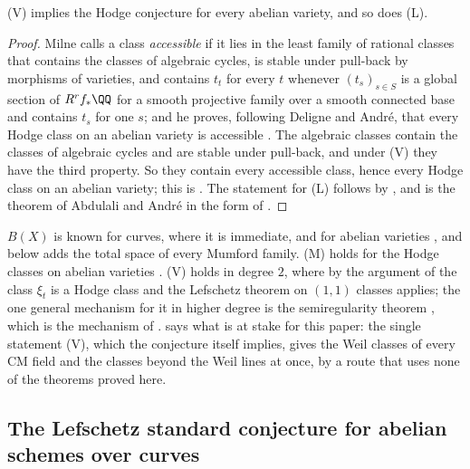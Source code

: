 \begin{theorem}\label{thm:vhcab}
\textup{(V)} implies the Hodge conjecture for every abelian variety, and so
does \textup{(L)}.
\end{theorem}

\begin{proof}
Milne calls a class \emph{accessible} if it lies in the least family of
rational classes that contains the classes of algebraic cycles, is stable
under pull-back by morphisms of varieties, and contains $t_{t}$ for every $t$
whenever $(t_{s})_{s\in S}$ is a global section of $R^{r}f_{*}\QQ$ for a
smooth projective family over a smooth connected base and contains $t_{s}$
for one $s$; and he proves, following Deligne and Andr\'e, that every Hodge
class on an abelian variety is accessible \cite[\S5.1, Theorem~3]{Mil20}.
The algebraic classes contain the classes of algebraic cycles and are stable
under pull-back, and under \textup{(V)} they have the third property. So they
contain every accessible class, hence every Hodge class on an abelian
variety; this is \cite[Remark~2]{Mil20}. The statement for \textup{(L)}
follows by , and is the theorem of Abdulali and Andr\'e in
the form of \cite[Theorem~4]{Mil20}.
\end{proof}

\begin{remark}\label{rem:lmvknown}
$B(X)$ is known for curves, where it is immediate,
and for abelian varieties \cite[\S2]{Kle68}, and 
below adds the total space of every Mumford family. \textup{(M)} holds for the Hodge
classes on abelian varieties \cite[Th\'eor\`eme~0.6.2]{And96b}.
\textup{(V)} holds in degree $2$, where by the argument of
 the class $\xi_{t}$ is a Hodge class and the Lefschetz
theorem on $(1,1)$ classes applies; the one general mechanism for it in
higher degree is the semiregularity theorem \cite{Blo72,BF03,Pri24}, which is the
mechanism of \cite[Theorem~2.3]{paperII}.  says what is at
stake for this paper: the single statement \textup{(V)}, which the conjecture
itself implies, gives the Weil classes of every CM field and the classes
beyond the Weil lines at once, by a route that uses none of the theorems
proved here.
\end{remark}

\subsection{The Lefschetz standard conjecture for abelian schemes over curves}
\label{ssec:newlefschetz}

